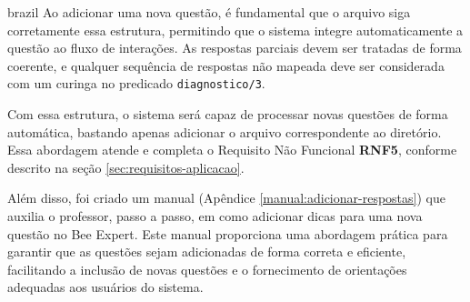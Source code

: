 \begin{otherlanguage*}{brazil}
Ao adicionar uma nova questão, é fundamental que o arquivo siga corretamente essa estrutura, permitindo que o sistema integre automaticamente a questão ao fluxo de interações. As respostas parciais devem ser tratadas de forma coerente, e qualquer sequência de respostas não mapeada deve ser considerada com um curinga no predicado \texttt{diagnostico/3}.

Com essa estrutura, o sistema será capaz de processar novas questões de forma automática, bastando apenas adicionar o arquivo correspondente ao diretório. Essa abordagem atende e completa o Requisito Não Funcional \textbf{RNF5}, conforme descrito na seção \ref{sec:requisitos-aplicacao}.

Além disso, foi criado um manual (Apêndice \ref{manual:adicionar-respostas}) que auxilia o professor, passo a passo, em como adicionar dicas para uma nova questão no Bee Expert. Este manual proporciona uma abordagem prática para garantir que as questões sejam adicionadas de forma correta e eficiente, facilitando a inclusão de novas questões e o fornecimento de orientações adequadas aos usuários do sistema.

\end{otherlanguage*}

